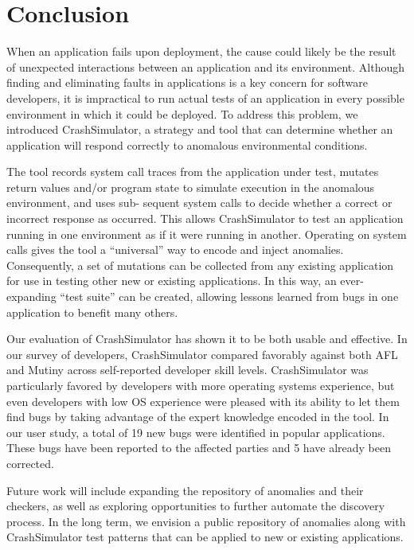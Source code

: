 \section{Conclusion}
\label{SEC:conclusion}

When an application fails upon deployment,
the cause could likely be the result
of unexpected interactions between
an application and its environment.  Although finding and eliminating
faults in applications is a key concern for software developers, it is
impractical to run actual tests  of an application in every possible
environment in
which it could be deployed.  To address this problem, we introduced
CrashSimulator, a strategy and tool
that can determine whether an application will
respond correctly to anomalous environmental conditions.

The tool records system call traces from the application under test,
mutates return values and/or program state to simulate execution in the
anomalous environment, and uses sub- sequent system calls to decide whether
a correct or incorrect response as occurred. This allows CrashSimulator to
test an application running in one environment as if it were running in
another. Operating on system calls gives the tool  a ``universal'' way to
encode and inject anomalies. Consequently, a set of mutations can be
collected from any existing application for use in testing other new or
existing applications. In this way, an ever-expanding ``test suite'' can be
created, allowing lessons learned from bugs in one application to benefit
many others.

Our evaluation of CrashSimulator has shown it to be both usable and
effective.  In our survey of developers, CrashSimulator compared favorably
against both AFL and Mutiny across self-reported developer skill levels.
CrashSimulator was particularly favored by developers with more operating
systems experience, but even developers with low OS experience were pleased
with its ability to let them find bugs by taking advantage of
the expert knowledge encoded in the tool.
In our user study, a total of
19 new bugs were identified in popular applications.
These bugs have been reported to the
affected parties and 5 have already been corrected.


Future work will include expanding the repository of anomalies and their
checkers, as well as exploring opportunities to further automate the
discovery process.  In the long term, we envision a
public repository of anomalies along with CrashSimulator test patterns that
can be applied to new or existing applications.
